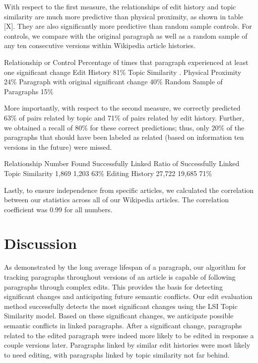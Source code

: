 With respect to the first measure, the relationships of edit history and
topic similarity are much more predictive than physical proximity, as
shown in table {[}X{]}. They are also significantly more predictive than
random sample controls. For controls, we compare with the original
paragraph as well as a random sample of any ten consecutive versions
within Wikipedia article histories.

Relationship or Control Percentage of times that paragraph experienced
at least one significant change Edit History 81\% Topic Similarity .
Physical Proximity 24\% Paragraph with original significant change 40\%
Random Sample of Paragraphs 15\%

More importantly, with respect to the second measure, we correctly
predicted 63\% of pairs related by topic and 71\% of pairs related by
edit history. Further, we obtained a recall of 80\% for these correct
predictions; thus, only 20\% of the paragraphs that should have been
labeled as related (based on information ten versions in the future)
were missed.

Relationship Number Found Successfully Linked Ratio of Successfully
Linked Topic Similarity 1,869 1,203 63\% Editing History 27,722 19,685
71\%

Lastly, to ensure independence from specific articles, we calculated the
correlation between our statistics across all of our Wikipedia articles.
The correlation coefficient was 0.99 for all numbers.

\section{Discussion}\label{discussion}

As demonstrated by the long average lifespan of a paragraph, our
algorithm for tracking paragraphs throughout versions of an article is
capable of following paragraphs through complex edits. This provides the
basis for detecting significant changes and anticipating future semantic
conflicts. Our edit evaluation method successfully detects the most
significant changes using the LSI Topic Similarity model. Based on these
significant changes, we anticipate possible semantic conflicts in linked
paragraphs. After a significant change, paragraphs related to the edited
paragraph were indeed more likely to be edited in response a couple
versions later. Paragraphs linked by similar edit histories were most
likely to need editing, with paragraphs linked by topic similarity not
far behind.

